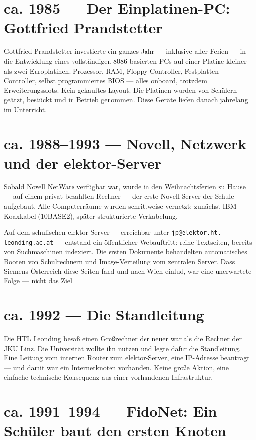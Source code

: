 \documentclass[11pt]{report}
\begin{document}
\section{ca. 1985 --- Der Einplatinen-PC: Gottfried Prandstetter}

Gottfried Prandstetter investierte ein ganzes Jahr --- inklusive aller Ferien --- in die Entwicklung eines vollständigen 8086-basierten PCs auf einer Platine kleiner als zwei Europlatinen. Prozessor, RAM, Floppy-Controller, Festplatten-Controller, selbst programmiertes BIOS --- alles onboard, trotzdem Erweiterungsslots. Kein gekauftes Layout. Die Platinen wurden von Schülern geätzt, bestückt und in Betrieb genommen. Diese Geräte liefen danach jahrelang im Unterricht.

\section{ca. 1988--1993 --- Novell, Netzwerk und der elektor-Server}

Sobald Novell NetWare verfügbar war, wurde in den Weihnachtsferien zu Hause --- auf einem privat bezahlten Rechner --- der erste Novell-Server der Schule aufgebaut. Alle Computerräume wurden schrittweise vernetzt: zunächst IBM-Koaxkabel (10BASE2), später strukturierte Verkabelung.

Auf dem schulischen elektor-Server --- erreichbar unter \texttt{jp@elektor.htl-leonding.ac.at} --- entstand ein öffentlicher Webauftritt: reine Textseiten, bereits von Suchmaschinen indexiert. Die ersten Dokumente behandelten automatisches Booten von Schulrechnern und Image-Verteilung vom zentralen Server. Dass Siemens Österreich diese Seiten fand und nach Wien einlud, war eine unerwartete Folge --- nicht das Ziel.

\section{ca. 1992 --- Die Standleitung}

Die HTL Leonding besaß einen Großrechner der neuer war als die Rechner der JKU Linz. Die Universität wollte ihn nutzen und legte dafür die Standleitung. Eine Leitung vom internen Router zum elektor-Server, eine IP-Adresse beantragt --- und damit war ein Internetknoten vorhanden. Keine große Aktion, eine einfache technische Konsequenz aus einer vorhandenen Infrastruktur.

\section{ca. 1991--1994 --- FidoNet: Ein Schüler baut den ersten Knoten}
\end{document}
